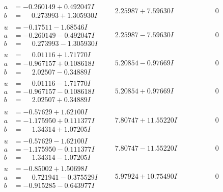 \documentclass[1p]{elsarticle_modified}
\theoremstyle{definition}
\begin{document}
$$\begin{array}{c|c|c}
\begin{aligned}
a &= -0.260149 + 0.492047 I \\
b &= \phantom{-}0.273993 + 1.305930 I\end{aligned}
 & \phantom{-}2.25987 + 7.59630 I & \phantom{-0.000000 } 0 \\ \hline\begin{aligned}
u &= -0.17511 - 1.68546 I \\
a &= -0.260149 - 0.492047 I \\
b &= \phantom{-}0.273993 - 1.305930 I\end{aligned}
 & \phantom{-}2.25987 - 7.59630 I & \phantom{-0.000000 } 0 \\ \hline\begin{aligned}
u &= \phantom{-}0.01116 + 1.71770 I \\
a &= -0.967157 + 0.108618 I \\
b &= \phantom{-}2.02507 - 0.34889 I\end{aligned}
 & \phantom{-}5.20854 - 0.97669 I & \phantom{-0.000000 } 0 \\ \hline\begin{aligned}
u &= \phantom{-}0.01116 - 1.71770 I \\
a &= -0.967157 - 0.108618 I \\
b &= \phantom{-}2.02507 + 0.34889 I\end{aligned}
 & \phantom{-}5.20854 + 0.97669 I & \phantom{-0.000000 } 0 \\ \hline\begin{aligned}
u &= -0.57629 + 1.62100 I \\
a &= -1.175950 + 0.111377 I \\
b &= \phantom{-}1.34314 + 1.07205 I\end{aligned}
 & \phantom{-}7.80747 + 11.55220 I & \phantom{-0.000000 } 0 \\ \hline\begin{aligned}
u &= -0.57629 - 1.62100 I \\
a &= -1.175950 - 0.111377 I \\
b &= \phantom{-}1.34314 - 1.07205 I\end{aligned}
 & \phantom{-}7.80747 - 11.55220 I & \phantom{-0.000000 } 0 \\ \hline\begin{aligned}
u &= -0.85002 + 1.50698 I \\
a &= \phantom{-}0.721941 - 0.375529 I \\
b &= -0.915285 - 0.643977 I\end{aligned}
 & \phantom{-}5.97924 + 10.75490 I & \phantom{-0.000000 } 0 \\ \hline\begin{aligned}

\end{aligned}
\end{array}$$
\end{document}
